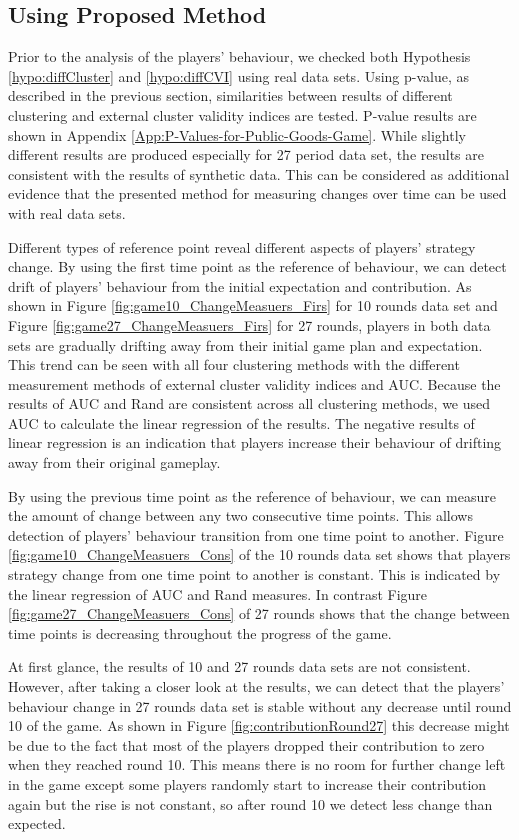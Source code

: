 \subsection{Using Proposed Method}

Prior to the analysis of the players' behaviour, we checked both Hypothesis \ref{hypo:diffCluster} and \ref{hypo:diffCVI} using real data sets. Using p-value, as described in the previous section, similarities between results of different clustering and external cluster validity indices are tested. P-value results are shown in Appendix \ref{App:P-Values-for-Public-Goods-Game}. While slightly different results are produced especially for 27 period data set, the results are consistent with the results of synthetic data. This can be considered as additional evidence that the presented method for measuring changes over time can be used with real data sets.

Different types of reference point reveal different aspects of players' strategy change. By using the first time point as the reference of behaviour, we can detect drift of players' behaviour from the initial expectation and contribution. As shown in Figure \ref{fig:game10_ChangeMeasuers_Firs} for 10 rounds data set and Figure \ref{fig:game27_ChangeMeasuers_Firs} for 27 rounds, players in both data sets are gradually drifting away from their initial game plan and expectation. This trend can be seen with all four clustering methods with the different measurement methods of external cluster validity indices and AUC. Because the results of AUC and Rand are consistent across all clustering methods, we used AUC to calculate the linear regression of the results. The negative results of linear regression is an indication that players increase their behaviour of drifting away from their original gameplay.

By using the previous time point as the reference of behaviour, we can measure the amount of change between any two consecutive time points. This allows detection of players' behaviour transition from one time point to another. Figure \ref{fig:game10_ChangeMeasuers_Cons} of the 10 rounds data set shows that players strategy change from one time point to another is constant. This is indicated by the linear regression of AUC and Rand measures. In contrast Figure \ref{fig:game27_ChangeMeasuers_Cons} of 27 rounds shows that the change between time points is decreasing throughout the progress of the game. 

At first glance, the results of 10 and 27 rounds data sets are not consistent. However, after taking a closer look at the results, we can detect that the players' behaviour change in 27 rounds data set is stable without any decrease until round 10 of the game. As shown in Figure \ref{fig:contributionRound27} this decrease might be due to the fact that most of the players dropped their contribution to zero when they reached round 10. This means there is no room for further change left in the game except some players randomly start to increase their contribution again but the rise is not constant, so after round 10 we detect less change than expected.

